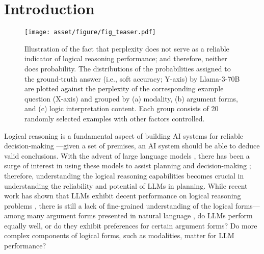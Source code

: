 \section{Introduction}

\begin{figure}[!t]
    \texttt{[image: asset/figure/fig\_teaser.pdf]}
    \vspace{-5pt}
    \caption{
        \label{fig:teaser}
        Illustration of the fact that perplexity does not serve as a reliable indicator of logical reasoning performance; and therefore, neither does probability.
        The distributions of the probabilities assigned to the ground-truth answer (i.e., soft accuracy; Y-axis) by Llama-3-70B are plotted against the perplexity of the corresponding example question (X-axis) and grouped by (a) modality, (b) argument forms, and (c) logic interpretation content.
        Each group consists of 20 randomly selected examples with other factors controlled.
    }
    \vspace{-5pt}
\end{figure}

Logical reasoning is a fundamental aspect of building AI systems for reliable decision-making ---given a set of premises, an AI system should be able to deduce valid conclusions.
With the advent of large language models \citep[LLMs; ][\textit{inter alia}]{touvronLlamaOpenFoundation2023,jiangMistral7B2023a,metaLlamaHerdModels2024}, there has been a surge of interest in using these models to assist planning and decision-making ;
therefore, understanding the logical reasoning capabilities becomes crucial in understanding the reliability and potential of LLMs in planning.
While recent work has shown that LLMs exhibit decent performance on logical reasoning problems ,
there is still a lack of fine-grained understanding of the logical forms---among many argument forms presented in natural language \citep{shieber-1993-problem}, do LLMs perform equally well, or do they exhibit preferences for certain argument forms?
Do more complex components of logical forms, such as modalities, matter for LLM performance?

